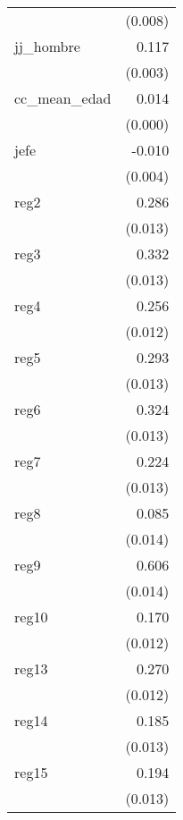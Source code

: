 {\begin{longtable}{l*{1}{D{.}{.}{-1}}}
            &     (0.008)         \\
\addlinespace
jj\_hombre   &       0.117\sym{***}\\
            &     (0.003)         \\
\addlinespace
cc\_mean\_edad&       0.014\sym{***}\\
            &     (0.000)         \\
\addlinespace
jefe        &      -0.010\sym{*}  \\
            &     (0.004)         \\
\addlinespace
reg2        &       0.286\sym{***}\\
            &     (0.013)         \\
\addlinespace
reg3        &       0.332\sym{***}\\
            &     (0.013)         \\
\addlinespace
reg4        &       0.256\sym{***}\\
            &     (0.012)         \\
\addlinespace
reg5        &       0.293\sym{***}\\
            &     (0.013)         \\
\addlinespace
reg6        &       0.324\sym{***}\\
            &     (0.013)         \\
\addlinespace
reg7        &       0.224\sym{***}\\
            &     (0.013)         \\
\addlinespace
reg8        &       0.085\sym{***}\\
            &     (0.014)         \\
\addlinespace
reg9        &       0.606\sym{***}\\
            &     (0.014)         \\
\addlinespace
reg10       &       0.170\sym{***}\\
            &     (0.012)         \\
\addlinespace
reg13       &       0.270\sym{***}\\
            &     (0.012)         \\
\addlinespace
reg14       &       0.185\sym{***}\\
            &     (0.013)         \\
\addlinespace
reg15       &       0.194\sym{***}\\
            &     (0.013)         \\

\end{longtable}}
